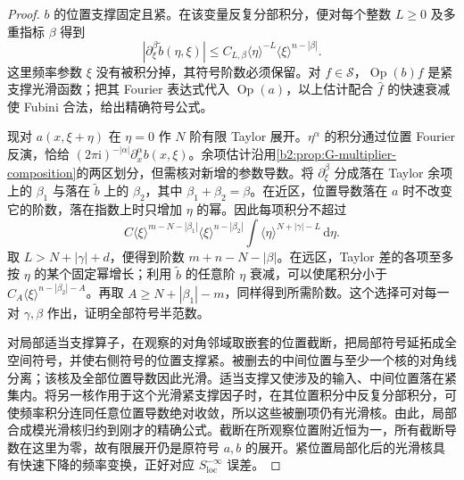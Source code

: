 \begin{proof}
\(b\) 的位置支撑固定且紧。在该变量反复分部积分，便对每个整数 \(L\ge0\) 及多重指标 \(\beta\) 得到
\[
 |\partial_\xi^\beta\widetilde b(\eta,\xi)|
 \le C_{L,\beta}\langle\eta\rangle^{-L}
                         \langle\xi\rangle^{n-|\beta|}.
\]
这里频率参数 \(\xi\) 没有被积分掉，其符号阶数必须保留。对 \(f\in\mathcal S\)，\(\operatorname{Op}(b)f\) 是紧支撑光滑函数；把其 Fourier 表达式代入 \(\operatorname{Op}(a)\)，以上估计配合 \(\widehat f\) 的快速衰减使 Fubini 合法，给出精确符号公式。

现对 \(a(x,\xi+\eta)\) 在 \(\eta=0\) 作 \(N\) 阶有限 Taylor 展开。\(\eta^\alpha\) 的积分通过位置 Fourier 反演，恰给 \((2\pi\mathrm i)^{-|\alpha|}\partial_x^\alpha b(x,\xi)\)。余项估计沿用\cref{b2:prop:G-multiplier-composition}的两区划分，但需核对新增的参数导数。将 \(\partial_\xi^\beta\) 分成落在 Taylor 余项上的 \(\beta_1\) 与落在 \(\widetilde b\) 上的 \(\beta_2\)，其中 \(\beta_1+\beta_2=\beta\)。在近区，位置导数落在 \(a\) 时不改变它的阶数，落在指数上时只增加 \(\eta\) 的幂。因此每项积分不超过
\[
 C\langle\xi\rangle^{m-N-|\beta_1|}
       \langle\xi\rangle^{n-|\beta_2|}
       \int\langle\eta\rangle^{N+|\gamma|-L}\,\mathrm d\eta.
\]
取 \(L>N+|\gamma|+d\)，便得到阶数 \(m+n-N-|\beta|\)。在远区，Taylor 差的各项至多按 \(\eta\) 的某个固定幂增长；利用 \(\widetilde b\) 的任意阶 \(\eta\) 衰减，可以使尾积分小于
\(C_A\langle\xi\rangle^{n-|\beta_2|-A}\)。再取 \(A\ge N+|\beta_1|-m\)，同样得到所需阶数。这个选择可对每一对 \(\gamma,\beta\) 作出，证明全部符号半范数。

对局部适当支撑算子，在观察的对角邻域取嵌套的位置截断，把局部符号延拓成全空间符号，并使右侧符号的位置支撑紧。被删去的中间位置与至少一个核的对角线分离；该核及全部位置导数因此光滑。适当支撑又使涉及的输入、中间位置落在紧集内。将另一核作用于这个光滑紧支撑因子时，在其位置积分中反复分部积分，可使频率积分连同任意位置导数绝对收敛，所以这些被删项仍有光滑核。由此，局部合成模光滑核归约到刚才的精确公式。截断在所观察位置附近恒为一，所有截断导数在这里为零，故有限展开仍是原符号 \(a,b\) 的展开。紧位置局部化后的光滑核具有快速下降的频率变换，正好对应 \(S^{-\infty}_{\mathrm{loc}}\) 误差。
\end{proof}

